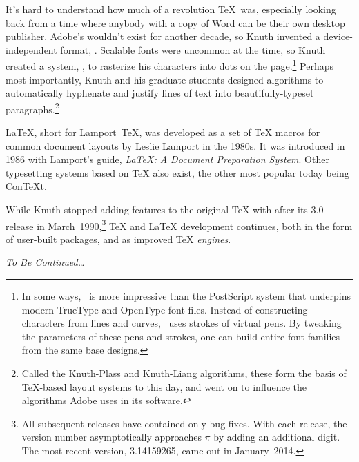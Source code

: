 It's hard to understand how much of a revolution \TeX\ was,
especially looking back from a time where anybody with a copy
of Word can be their own desktop publisher.
Adobe's  wouldn't exist for another decade, so Knuth
invented a device-independent format, .
Scalable fonts were uncommon at the time, so Knuth created a system,
\MF, to rasterize his characters into dots on the
page.\punckern\footnote{In some ways,
\MF\ is more impressive than the PostScript system that
underpins modern TrueType and OpenType font files.
Instead of constructing characters from lines and curves,
\MF\ uses strokes of virtual pens.
By tweaking the parameters of these pens and strokes, one can build entire
font families from the same base designs.}
Perhaps most importantly, Knuth and his graduate students designed algorithms
to automatically hyphenate and justify lines of text into
beautifully-typeset paragraphs.\footnote{Called the Knuth-Plass and
Knuth-Liang algorithms,
these form the basis of \TeX-based layout systems to this day,
and went on to influence the algorithms Adobe uses in its software.\punckern{}}

\LaTeX{}, short for Lamport~\TeX{}, was developed as a set of \TeX{} macros for
common document layouts by Leslie Lamport in the 1980s.
It was introduced in 1986 with Lamport's guide,
\textit{\LaTeX: A Document Preparation System}.
Other typesetting systems based on \TeX{} also exist,
the other most popular today being Con\TeX{}t.

While Knuth stopped adding features to the original \TeX{} with after
its 3.0 release in March~1990,\punckern\footnote{All subsequent releases have
contained only bug fixes.
With each release, the version number asymptotically approaches $\pi$
by adding an additional digit.
The most recent version, 3.14159265, came out in January~2014.}
\TeX{} and \LaTeX{} development continues,
both in the form of user-built packages, and as improved \TeX{} \emph{engines}.

\textit{To Be Continued\ldots}
